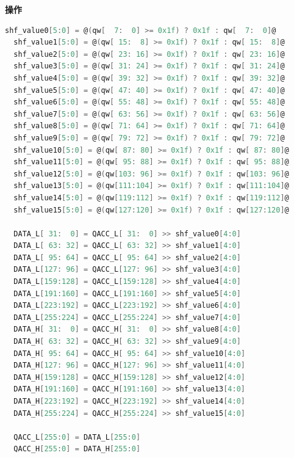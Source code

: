 \textbf{操作}

\begin{lstlisting}[language=C, escapechar=@]
  shf_value0[5:0] = @(qw[  7:  0] >= 0x1f) ? 0x1f : qw[  7:  0]@
  shf_value1[5:0] = @(qw[ 15:  8] >= 0x1f) ? 0x1f : qw[ 15:  8]@
  shf_value2[5:0] = @(qw[ 23: 16] >= 0x1f) ? 0x1f : qw[ 23: 16]@
  shf_value3[5:0] = @(qw[ 31: 24] >= 0x1f) ? 0x1f : qw[ 31: 24]@
  shf_value4[5:0] = @(qw[ 39: 32] >= 0x1f) ? 0x1f : qw[ 39: 32]@
  shf_value5[5:0] = @(qw[ 47: 40] >= 0x1f) ? 0x1f : qw[ 47: 40]@
  shf_value6[5:0] = @(qw[ 55: 48] >= 0x1f) ? 0x1f : qw[ 55: 48]@
  shf_value7[5:0] = @(qw[ 63: 56] >= 0x1f) ? 0x1f : qw[ 63: 56]@
  shf_value8[5:0] = @(qw[ 71: 64] >= 0x1f) ? 0x1f : qw[ 71: 64]@
  shf_value9[5:0] = @(qw[ 79: 72] >= 0x1f) ? 0x1f : qw[ 79: 72]@
  shf_value10[5:0] = @(qw[ 87: 80] >= 0x1f) ? 0x1f : qw[ 87: 80]@
  shf_value11[5:0] = @(qw[ 95: 88] >= 0x1f) ? 0x1f : qw[ 95: 88]@
  shf_value12[5:0] = @(qw[103: 96] >= 0x1f) ? 0x1f : qw[103: 96]@
  shf_value13[5:0] = @(qw[111:104] >= 0x1f) ? 0x1f : qw[111:104]@
  shf_value14[5:0] = @(qw[119:112] >= 0x1f) ? 0x1f : qw[119:112]@
  shf_value15[5:0] = @(qw[127:120] >= 0x1f) ? 0x1f : qw[127:120]@

  DATA_L[ 31:  0] = QACC_L[ 31:  0] >> shf_value0[4:0]
  DATA_L[ 63: 32] = QACC_L[ 63: 32] >> shf_value1[4:0]
  DATA_L[ 95: 64] = QACC_L[ 95: 64] >> shf_value2[4:0]
  DATA_L[127: 96] = QACC_L[127: 96] >> shf_value3[4:0]
  DATA_L[159:128] = QACC_L[159:128] >> shf_value4[4:0]
  DATA_L[191:160] = QACC_L[191:160] >> shf_value5[4:0]
  DATA_L[223:192] = QACC_L[223:192] >> shf_value6[4:0]
  DATA_L[255:224] = QACC_L[255:224] >> shf_value7[4:0]
  DATA_H[ 31:  0] = QACC_H[ 31:  0] >> shf_value8[4:0]
  DATA_H[ 63: 32] = QACC_H[ 63: 32] >> shf_value9[4:0]
  DATA_H[ 95: 64] = QACC_H[ 95: 64] >> shf_value10[4:0]
  DATA_H[127: 96] = QACC_H[127: 96] >> shf_value11[4:0]
  DATA_H[159:128] = QACC_H[159:128] >> shf_value12[4:0]
  DATA_H[191:160] = QACC_H[191:160] >> shf_value13[4:0]
  DATA_H[223:192] = QACC_H[223:192] >> shf_value14[4:0]
  DATA_H[255:224] = QACC_H[255:224] >> shf_value15[4:0]

  QACC_L[255:0] = DATA_L[255:0]
  QACC_H[255:0] = DATA_H[255:0]


\end{lstlisting}
